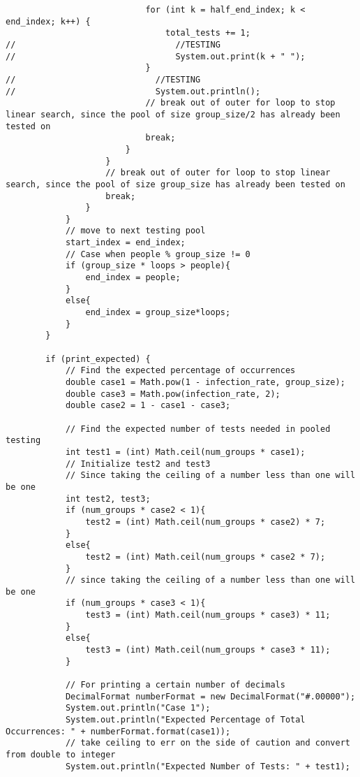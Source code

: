\documentclass{article}
\begin{document}
\begin{lstlisting}
                            for (int k = half_end_index; k < end_index; k++) {
                                total_tests += 1;
//                                //TESTING
//                                System.out.print(k + " ");
                            }
//                            //TESTING
//                            System.out.println();
                            // break out of outer for loop to stop linear search, since the pool of size group_size/2 has already been tested on
                            break;
                        }
                    }
                    // break out of outer for loop to stop linear search, since the pool of size group_size has already been tested on
                    break;
                }
            }
            // move to next testing pool
            start_index = end_index;
            // Case when people % group_size != 0
            if (group_size * loops > people){
                end_index = people;
            }
            else{
                end_index = group_size*loops;
            }
        }

        if (print_expected) {
            // Find the expected percentage of occurrences
            double case1 = Math.pow(1 - infection_rate, group_size);
            double case3 = Math.pow(infection_rate, 2);
            double case2 = 1 - case1 - case3;

            // Find the expected number of tests needed in pooled testing
            int test1 = (int) Math.ceil(num_groups * case1);
            // Initialize test2 and test3
            // Since taking the ceiling of a number less than one will be one
            int test2, test3;
            if (num_groups * case2 < 1){
                test2 = (int) Math.ceil(num_groups * case2) * 7;
            }
            else{
                test2 = (int) Math.ceil(num_groups * case2 * 7);
            }
            // since taking the ceiling of a number less than one will be one
            if (num_groups * case3 < 1){
                test3 = (int) Math.ceil(num_groups * case3) * 11;
            }
            else{
                test3 = (int) Math.ceil(num_groups * case3 * 11);
            }

            // For printing a certain number of decimals
            DecimalFormat numberFormat = new DecimalFormat("#.00000");
            System.out.println("Case 1");
            System.out.println("Expected Percentage of Total Occurrences: " + numberFormat.format(case1));
            // take ceiling to err on the side of caution and convert from double to integer
            System.out.println("Expected Number of Tests: " + test1);


\end{lstlisting}
\end{document}
